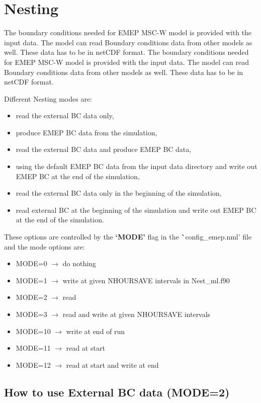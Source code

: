 \section{Nesting}
\label{sec:nesting}

The boundary conditions needed for EMEP  MSC-W model is provided with the input data. 
The model can read Boundary conditions data from other models as well.  These data has
to be in netCDF format.  The boundary conditions needed for EMEP  MSC-W model is provided with the 	input data.  The model can read Boundary conditions data from other models as well. 
These data has to be in netCDF format.  

Different Nesting modes are:

\begin{itemize}			
\item read the external BC data only,
\item produce EMEP BC data from the simulation, 
\item read the external BC data and produce EMEP BC data, 
\item using the default EMEP BC data from the input data directory and write out EMEP BC at the end of the simulation, 
\item read the external BC data only in the beginning of the simulation,
\item read external BC at the beginning of the simulation and write out EMEP BC at the end of the simulation.   	
\end{itemize}	

These options are controlled by the {\bf`MODE'} flag  in the {\textbf `config\_emep.nml'} file and the mode options are:

\begin{itemize}
\item MODE=0   ${\rightarrow}$  do nothing
\item MODE=1   ${\rightarrow}$  write at given NHOURSAVE intervals in Nest\_ml.f90  
\item MODE=2   ${\rightarrow}$  read 
\item MODE=3   ${\rightarrow}$  read and write at given NHOURSAVE intervals 
\item MODE=10  ${\rightarrow}$  write at end of run 
\item MODE=11  ${\rightarrow}$  read at start
\item MODE=12  ${\rightarrow}$ read at start and write at end 
\end{itemize}


\subsection{How to use External BC data (MODE=2)}

